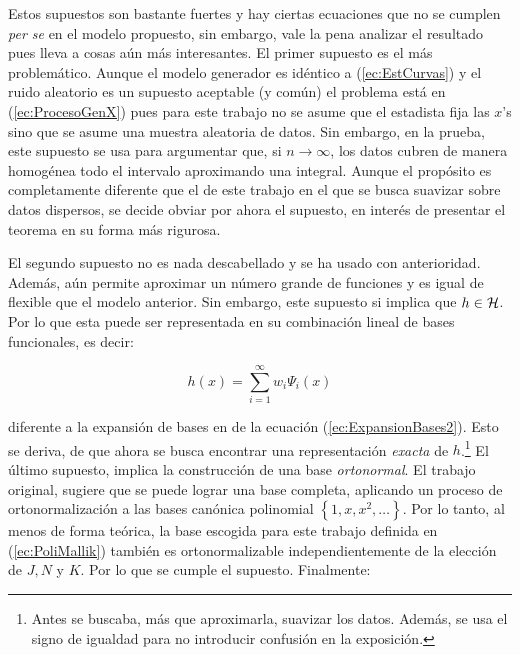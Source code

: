 \documentclass[../../Main/Main.tex]{subfiles}
\begin{document}
Estos supuestos son bastante fuertes y hay ciertas ecuaciones que no se cumplen \textit{per se} en el modelo propuesto, sin embargo, vale la pena analizar el resultado pues lleva a cosas aún más interesantes. El primer supuesto es el más problemático. Aunque el modelo generador es idéntico a (\ref{ec:EstCurvas}) y el ruido aleatorio es un supuesto aceptable (y común) el problema está en (\ref{ec:ProcesoGenX}) pues para este trabajo no se asume que el estadista fija las $x$'s sino que se asume una muestra aleatoria de datos. Sin embargo, en la prueba, este supuesto se usa para argumentar que, si $n\rightarrow\infty$, los datos cubren de manera homogénea todo el intervalo aproximando una integral. Aunque el propósito es completamente diferente que el de este trabajo en el que se busca suavizar sobre datos dispersos, se decide obviar por ahora el supuesto, en interés de presentar el teorema en su forma más rigurosa.

El segundo supuesto no es nada descabellado y se ha usado con anterioridad. Además, aún permite aproximar un número  grande de funciones y es igual de flexible que el modelo anterior. Sin embargo, este supuesto si implica que $h\in\mathcal{H}$. Por lo que esta puede ser representada en su combinación lineal de bases funcionales, es decir:

$$h(x) = \sum_{i = 1}^\infty w_i \Psi_i(x)$$

diferente a la expansión de bases en de la ecuación (\ref{ec:ExpansionBases2}). Esto se deriva, de que ahora se busca encontrar una representación \textit{exacta} de $h$.\footnote{Antes se buscaba, más que aproximarla, suavizar los datos. Además, se usa el signo de igualdad para no introducir confusión en la exposición.} El último supuesto, implica la construcción de una base \textit{ortonormal}. El trabajo original, sugiere que se puede lograr una base completa, aplicando un proceso de ortonormalización a las bases canónica polinomial $\left\{1,x,x^2,\ldots\right\}$. Por lo tanto, al menos de forma teórica, la base escogida para este trabajo definida en (\ref{ec:PoliMallik}) también es ortonormalizable independientemente de la elección de $J,N$ y $K$. Por lo que se cumple el supuesto. Finalmente:
\end{document}
